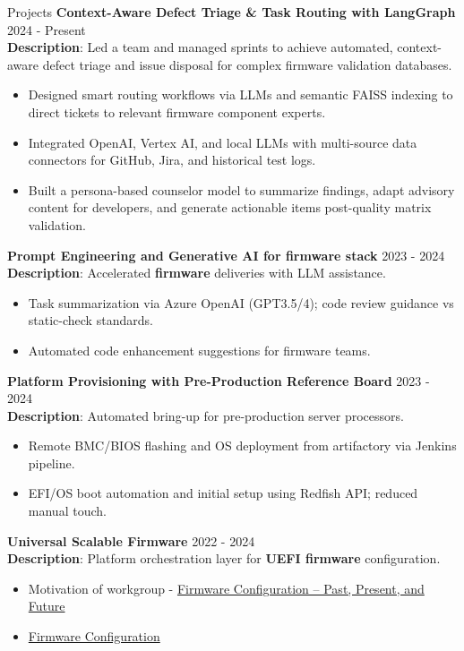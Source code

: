 \documentclass{resume} %
\begin{document}
\begin{rSection}{Projects}
{\bf Context-Aware Defect Triage \& Task Routing with LangGraph} \hfill {2024 - Present}\\
\textbf{Description}: Led a team and managed sprints to achieve automated, context-aware defect triage and issue disposal for complex firmware validation databases.
\begin{itemize}
    \item Designed smart routing workflows via LLMs and semantic FAISS indexing to direct tickets to relevant firmware component experts.
    \item Integrated OpenAI, Vertex AI, and local LLMs with multi-source data connectors for GitHub, Jira, and historical test logs.
    \item Built a persona-based counselor model to summarize findings, adapt advisory content for developers, and generate actionable items post-quality matrix validation.
\end{itemize}

{\bf Prompt Engineering and Generative AI for firmware stack} \hfill {2023 - 2024}\\
\textbf{Description}: Accelerated \textbf{firmware} deliveries with LLM assistance.

\begin{itemize}
    \item Task summarization via Azure OpenAI (GPT3.5/4); code review guidance vs static-check standards.
    \item Automated code enhancement suggestions for firmware teams.
\end{itemize}

{\bf Platform Provisioning with Pre-Production Reference Board} \hfill {2023 - 2024}\\
\textbf{Description}: Automated bring-up for pre-production server processors.

\begin{itemize}
    \item Remote BMC/BIOS flashing and OS deployment from artifactory via Jenkins pipeline.
    \item EFI/OS boot automation and initial setup using Redfish API; reduced manual touch.
\end{itemize}

\textbf{Universal Scalable Firmware} \hfill {2022 - 2024} \\
\textbf{Description}: Platform orchestration layer for \textbf{UEFI firmware} configuration.

\begin{itemize}
    \item Motivation of workgroup - \href{https://uefi.org/sites/default/files/resources/Firmware%20Configuration%20%E2%80%93%20Past,%20Present,%20and%20Future_Zimmer.pdf}{Firmware Configuration – Past, Present, and Future}
    \item \href{https://universalscalablefirmware.github.io/documentation/7_yaml_boot_configuration.html}{Firmware Configuration}
\end{itemize}


\end{rSection}
\end{document}
